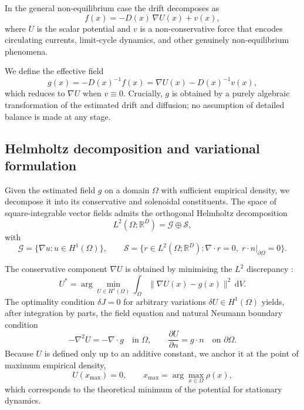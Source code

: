 \documentclass[11pt,a4paper]{article}
\newcommand{\R}{\mathbb{R}}
\newcommand{\dd}{\mathrm{d}}
\newcommand{\grad}{\nabla}
\newcommand{\Div}{\nabla\!\cdot\!}
\newcommand{\norm}[1]{\lVert #1 \rVert}
\begin{document}
In the general non-equilibrium case the drift decomposes as
\begin{equation}
f(x) = -D(x)\,\grad U(x) + v(x),
\label{eq:drift_decomp}
\end{equation}
where $U$ is the scalar potential and $v$ is a non-conservative force that
encodes circulating currents, limit-cycle dynamics, and other genuinely
non-equilibrium phenomena.

We define the effective field
\begin{equation}
g(x) = -D(x)^{-1} f(x) = \grad U(x) - D(x)^{-1} v(x),
\label{eq:effective_field}
\end{equation}
which reduces to $\grad U$ when $v \equiv 0$. Crucially, $g$ is obtained by a
purely algebraic transformation of the estimated drift and diffusion; no
assumption of detailed balance is made at any stage.

\subsection{Helmholtz decomposition and variational formulation}
\label{sec:helmholtz}

Given the estimated field $g$ on a domain $\Omega$ with sufficient empirical
density, we decompose it into its conservative and solenoidal constituents. The
space of square-integrable vector fields admits the orthogonal Helmholtz
decomposition \cite{strang1986,helmholtz1858}
\begin{equation}
L^2(\Omega;\R^D) = \mathcal{G} \oplus \mathcal{S},
\end{equation}
with
\begin{equation}
\mathcal{G} = \{ \grad u : u \in H^1(\Omega) \},
\qquad
\mathcal{S} = \{ r \in L^2(\Omega;\R^D) : \Div r = 0,\;
r \cdot n|_{\partial\Omega} = 0 \}.
\end{equation}

The conservative component $\grad U$ is obtained by minimising the $L^2$
discrepancy \cite{strang1986}:
\begin{equation}
U^* = \arg\min_{U \in H^1(\Omega)}
\int_\Omega \norm{\grad U(x) - g(x)}^2 \, \dd V .
\label{eq:variational}
\end{equation}
The optimality condition $\delta J = 0$ for arbitrary variations
$\delta U \in H^1(\Omega)$ yields, after integration by parts, the field
equation and natural Neumann boundary condition
\begin{equation}
-\grad^2 U = -\Div g \quad \text{in } \Omega,
\qquad
\frac{\partial U}{\partial n} = g \cdot n \quad \text{on } \partial\Omega .
\label{eq:poisson_U}
\end{equation}
Because $U$ is defined only up to an additive constant, we anchor it at the
point of maximum empirical density,
\begin{equation}
U(x_{\max}) = 0,
\qquad
x_{\max} = \arg\max_{x \in \Omega} \rho(x),
\label{eq:anchoring}
\end{equation}
which corresponds to the theoretical minimum of the potential for stationary
dynamics.
\end{document}
